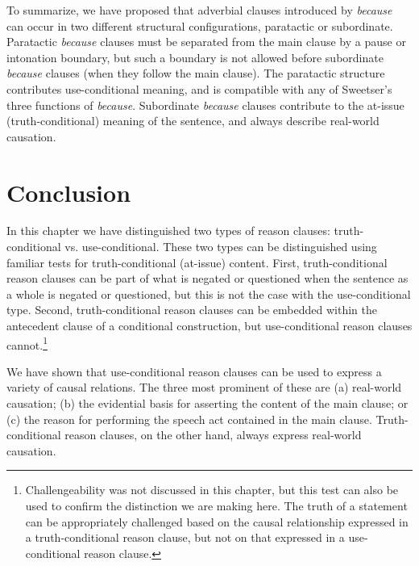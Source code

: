 \ea \label{ex:18.47}
\z \z


To summarize, we have proposed that adverbial clauses introduced by \textit{because} can occur in two different structural configurations, paratactic or subordinate. Paratactic \textit{because} clauses must be separated from the main clause by a pause or intonation boundary, but such a boundary is not allowed before subordinate \textit{because} clauses (when they follow the main clause). The paratactic structure contributes use-conditional meaning, and is compatible with any of Sweetser’s three functions of \textit{because}. Subordinate \textit{because} clauses contribute to the at-issue (truth-conditional) meaning of the sentence, and always describe real-world causation.





\section{Conclusion}\label{sec:18.6}

In this chapter we have distinguished two types of reason clauses: truth-conditional vs. use-conditional. These two types can be distinguished using familiar tests for truth-conditional (at-issue) content. First, truth-conditional reason clauses can be part of what is negated or questioned when the sentence as a whole is negated or questioned, but this is not the case with the use-conditional type. Second, truth-conditional reason clauses can be embedded within the antecedent clause of a conditional construction, but use-conditional reason clauses cannot.\footnote{Challengeability  was not discussed in this chapter, but this test can also be used to confirm the distinction we are making here. The truth of a statement can be appropriately challenged based on the causal relationship expressed in a truth-conditional reason clause, but not on that expressed in a use-conditional reason clause.}


We have shown that use-conditional reason clauses can be used to express a variety of causal relations. The three most prominent of these are (a) real-world causation; (b) the evidential basis for asserting the content of the main clause; or (c) the reason for performing the speech act contained in the main clause. Truth-conditional reason clauses, on the other hand, always express real-world causation.  


